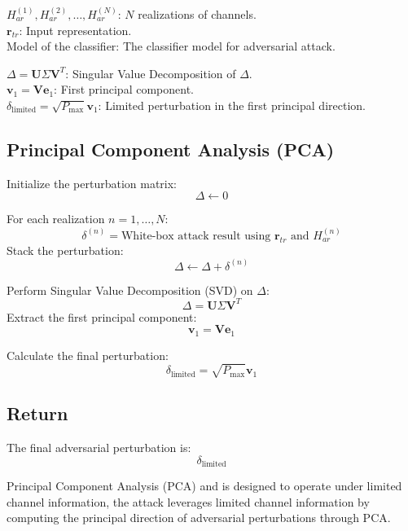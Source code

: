 $H^{(1)}_{ar}, H^{(2)}_{ar}, \ldots, H^{(N)}_{ar}$: $N$ realizations of channels. \\
$\mathbf{r}_{tr}$: Input representation. \\
Model of the classifier: The classifier model for adversarial attack.

$\Delta = \mathbf{U} \Sigma \mathbf{V}^T$: Singular Value Decomposition of $\Delta$. \\
$\mathbf{v}_1 = \mathbf{V}\mathbf{e}_1$: First principal component. \\
$\delta_{\text{limited}} = \sqrt{P_{\text{max}}} \mathbf{v}_1$: Limited perturbation in the first principal direction.

\subsection*{Principal Component Analysis (PCA)}
Initialize the perturbation matrix:
\[
\Delta \leftarrow 0
\]

For each realization $n = 1, \ldots, N$:
\[
\delta^{(n)} = \text{White-box attack result using } \mathbf{r}_{tr} \text{ and } H^{(n)}_{ar}
\]
Stack the perturbation:
\[
\Delta \leftarrow \Delta + \delta^{(n)}
\]

Perform Singular Value Decomposition (SVD) on $\Delta$:
\[
\Delta = \mathbf{U} \Sigma \mathbf{V}^T
\]
Extract the first principal component:
\[
\mathbf{v}_1 = \mathbf{V} \mathbf{e}_1
\]

Calculate the final perturbation:
\[
\delta_{\text{limited}} = \sqrt{P_{\text{max}}} \mathbf{v}_1
\]

\subsection*{Return}
The final adversarial perturbation is:
\[
\delta_{\text{limited}}
\]


Principal Component Analysis (PCA) and is designed to operate under limited channel information, the attack leverages limited channel information by computing the principal direction of adversarial perturbations through PCA.
